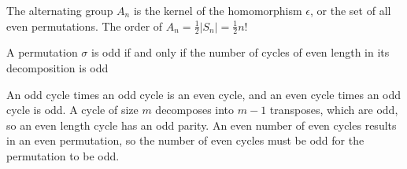 \documentclass{article}
\begin{document}
\begin{definition}
The alternating group $A_n$ is the kernel of the homomorphism $\epsilon$, or the set of all even permutations. The order of $A_n = \frac{1}{2} \vert S_n\vert = \frac{1}{2}n!$
\end{definition}

\begin{proposition}
A permutation $\sigma$ is odd if and only if the number of cycles of even length in its decomposition is odd
\end{proposition}

\begin{customproof}
An odd cycle times an odd cycle is an even cycle, and an even cycle times an odd cycle is odd. A cycle of size $m$ decomposes into $m-1$ transposes, which are odd, so an even length cycle has an odd parity. An even number of even cycles results in an even permutation, so the number of even cycles must be odd for the permutation to be odd. 
\end{customproof}
\end{document}
